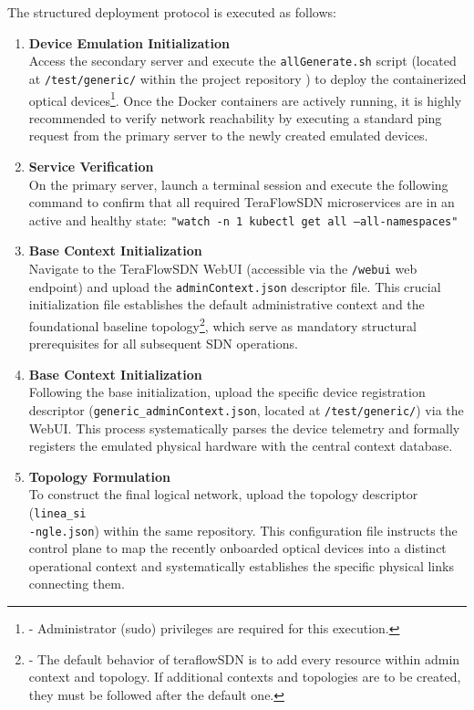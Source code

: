 The structured deployment protocol is executed as follows:
\begin{enumerate}
    \item \textbf{Device Emulation Initialization} \vspace{0.2cm} \\Access the secondary server and execute the \texttt{allGenerate.sh} script (located at \texttt{/test/generic/} within the project repository \cite{chafiTFSGit}) to deploy the containerized optical devices\footnote{- Administrator (sudo) privileges are required for this execution.}. Once the Docker containers are actively running, it is highly recommended to verify network reachability by executing a standard ping request from the primary server to the newly created emulated devices.
    \item \textbf{Service Verification} \vspace{0.2cm} \\On the primary server, launch a terminal session and execute the following command to confirm that all required TeraFlowSDN microservices are in an active and healthy state: \texttt{"watch -n 1 kubectl get all --all-namespaces"}
    \item \textbf{Base Context Initialization} \vspace{0.2cm} \\Navigate to the TeraFlowSDN WebUI (accessible via the \texttt{/webui} web endpoint) and upload the \texttt{adminContext.json} descriptor file. This crucial initialization file establishes the default administrative context and the foundational baseline topology\footnote{- The default behavior of teraflowSDN is to add every resource within admin context and topology. If additional contexts and topologies are to be created, they must be followed after the default one.}, which serve as mandatory structural prerequisites for all subsequent SDN operations.
    \item \textbf{Base Context Initialization} \vspace{0.2cm} \\Following the base initialization, upload the specific device registration descriptor (\texttt{generic\_adminContext.json}, located at \texttt{/test/generic/}) via the WebUI. This process systematically parses the device telemetry and formally registers the emulated physical hardware with the central context database.
    \item \textbf{Topology Formulation} \vspace{0.2cm} \\To construct the final logical network, upload the topology descriptor (\texttt{linea\_si\\-ngle.json}) within the same repository. This configuration file instructs the control plane to map the recently onboarded optical devices into a distinct operational context and systematically establishes the specific physical links connecting them.
\end{enumerate}

